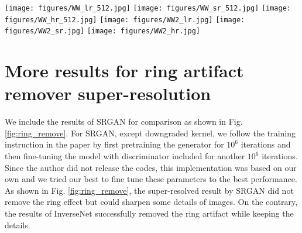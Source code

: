 \documentclass[10pt,twocolumn,letterpaper]{article}
\begin{document}
\begin{appendices}
\begin{figure*}[ht]
\centering
{}
\caption{Motion deblurring for a $256\times 256$ image with model trained on $128\times 128$ images.}
\label{fig:mot_deblur}
\end{figure*}

\begin{figure*}[ht]
\centering
\texttt{[image: figures/WW\_lr\_512.jpg]}
\texttt{[image: figures/WW\_sr\_512.jpg]}
\texttt{[image: figures/WW\_hr\_512.jpg]}
\texttt{[image: figures/WW2\_lr.jpg]}
\texttt{[image: figures/WW2\_sr.jpg]}
\texttt{[image: figures/WW2\_hr.jpg]}
\caption{Motion deblurring for $512\times 512$ image with model trained on $128\times 128$ images. From left to right: blurred image, deblurred image by InverseNet, and original image.}
\label{fig:mot_deblur_512}
\end{figure*}

\begin{figure*}[h]
\centering
{}
\caption{\textbf{Ring Effect Remover} on ImageNet for $64\times 64\rightarrow 256\times 256$.}
\label{fig:ring_remove}
\end{figure*}

\section{More results for ring artifact remover super-resolution}
We include the results of SRGAN \cite{ledig2016photo} for comparison as shown in Fig. \ref{fig:ring_remove}. 
For SRGAN, except downgraded kernel, we follow the training instruction in the paper by first pretraining the generator
for $10^6$ iterations and then fine-tuning the model with discriminator included for another $10^6$ iterations. 
Since the author did not release the codes, this implementation was based on our own and we tried our best to fine tune these parameters
to the best performance. As shown in Fig. \ref{fig:ring_remove}, the super-resolved result by SRGAN did 
not remove the ring effect but could sharpen some details of images. On the contrary, the results of InverseNet
successfully removed the ring artifact while keeping the details.



\end{appendices}
\end{document}
